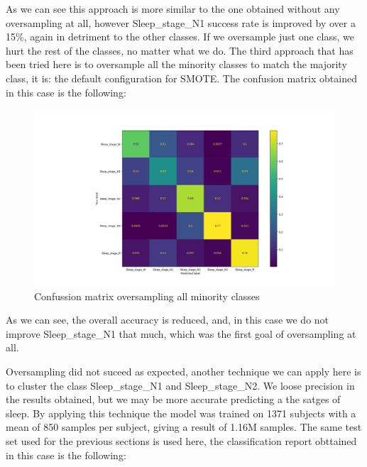 As we can see this approach is more similar to the one obtained without any oversampling at all, however Sleep\_stage\_N1 success rate is improved by over a 15\%, again in detriment to the other classes. If we oversample just one class, we hurt the rest of the classes, no matter what we do. The third approach that has been tried here is to oversample all the minority classes to match the majority class, it is: the default configuration for SMOTE. The confusion matrix obtained in this case is the following:

\begin{figure}[H]
\centering
\hspace*{-2cm}\includegraphics[scale=.5]{figs/cm-da-all.png}
\caption{Confussion matrix oversampling all minority classes}
\label{fig7}
\end{figure}

As we can see, the overall accuracy is reduced, and, in this case we do not improve Sleep\_stage\_N1 that much, which was the first goal of oversampling at all.

Oversampling did not suceed as expected, another technique we can apply here is to cluster the class Sleep\_stage\_N1 and Sleep\_stage\_N2. We loose precision in the results obtained, but we may be more accurate predicting a the satges of sleep. By applying this technique the model was trained on 1371 subjects with a mean of 850 samples per subject, giving a result of 1.16M samples. The same test set used for the previous sections is used here, the classification report obttained in this case is the following:

